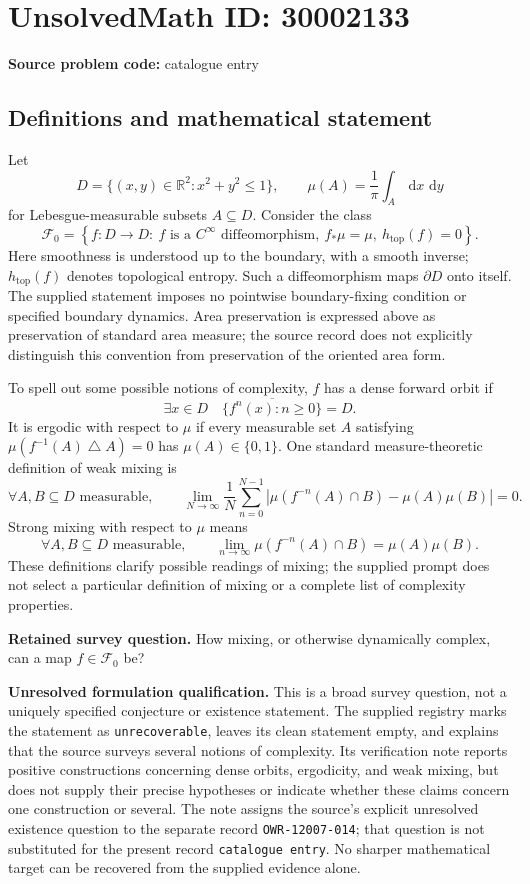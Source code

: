 \documentclass[11pt]{article}
\newcommand{\R}{\mathbb{R}}
\newcommand{\dd}{\,\mathrm{d}}
\begin{document}
\section*{UnsolvedMath ID: 30002133}
\textbf{Source problem code:} catalogue entry
\subsection{Definitions and mathematical statement}
Let
\[
D=\{(x,y)\in\R^2:x^2+y^2\leq 1\},\qquad
\mu(A)=\frac{1}{\pi}\int_A\dd x\,\dd y
\]
for Lebesgue-measurable subsets \(A\subseteq D\). Consider the class
\[
\mathcal F_0=\left\{f:D\longrightarrow D:\ f\text{ is a }C^\infty\text{ diffeomorphism},\ f_*\mu=\mu,\ h_{\mathrm{top}}(f)=0\right\}.
\]
Here smoothness is understood up to the boundary, with a smooth inverse; \(h_{\mathrm{top}}(f)\) denotes topological entropy. Such a diffeomorphism maps \(\partial D\) onto itself. The supplied statement imposes no pointwise boundary-fixing condition or specified boundary dynamics. Area preservation is expressed above as preservation of standard area measure; the source record does not explicitly distinguish this convention from preservation of the oriented area form.

To spell out some possible notions of complexity, \(f\) has a dense forward orbit if
\[
\exists x\in D\quad \overline{\{f^n(x):n\geq 0\}}=D.
\]
It is ergodic with respect to \(\mu\) if every measurable set \(A\) satisfying \(\mu(f^{-1}(A)\mathbin{\triangle}A)=0\) has \(\mu(A)\in\{0,1\}\). One standard measure-theoretic definition of weak mixing is
\[
\forall A,B\subseteq D\text{ measurable},\qquad
\lim_{N\to\infty}\frac1N\sum_{n=0}^{N-1}
\left|\mu(f^{-n}(A)\cap B)-\mu(A)\mu(B)\right|=0.
\]
Strong mixing with respect to \(\mu\) means
\[
\forall A,B\subseteq D\text{ measurable},\qquad
\lim_{n\to\infty}\mu(f^{-n}(A)\cap B)=\mu(A)\mu(B).
\]
These definitions clarify possible readings of mixing; the supplied prompt does not select a particular definition of mixing or a complete list of complexity properties.

\textbf{Retained survey question.} How mixing, or otherwise dynamically complex, can a map \(f\in\mathcal F_0\) be?

\textbf{Unresolved formulation qualification.} This is a broad survey question, not a uniquely specified conjecture or existence statement. The supplied registry marks the statement as \texttt{unrecoverable}, leaves its clean statement empty, and explains that the source surveys several notions of complexity. Its verification note reports positive constructions concerning dense orbits, ergodicity, and weak mixing, but does not supply their precise hypotheses or indicate whether these claims concern one construction or several. The note assigns the source's explicit unresolved existence question to the separate record \texttt{OWR-12007-014}; that question is not substituted for the present record \texttt{catalogue entry}. No sharper mathematical target can be recovered from the supplied evidence alone.
\end{document}
